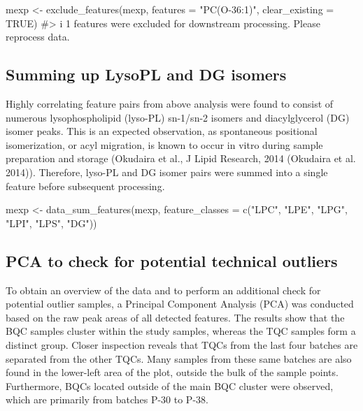 \documentclass[
  letterpaper,
  DIV=11,
  numbers=noendperiod]{scrartcl}
\newenvironment{Shaded}{\begin{snugshade}}{\end{snugshade}}
\newcommand{\AttributeTok}[1]{\textcolor[rgb]{0.40,0.45,0.13}{#1}}
\newcommand{\CommentTok}[1]{\textcolor[rgb]{0.37,0.37,0.37}{#1}}
\newcommand{\ConstantTok}[1]{\textcolor[rgb]{0.56,0.35,0.01}{#1}}
\newcommand{\FunctionTok}[1]{\textcolor[rgb]{0.28,0.35,0.67}{#1}}
\newcommand{\NormalTok}[1]{\textcolor[rgb]{0.00,0.23,0.31}{#1}}
\newcommand{\OtherTok}[1]{\textcolor[rgb]{0.00,0.23,0.31}{#1}}
\newcommand{\StringTok}[1]{\textcolor[rgb]{0.13,0.47,0.30}{#1}}
\begin{document}
\begin{Shaded}
\begin{Highlighting}[]
\NormalTok{mexp }\OtherTok{\textless{}{-}} \FunctionTok{exclude\_features}\NormalTok{(mexp, }\AttributeTok{features =} \StringTok{"PC(O{-}36:1)"}\NormalTok{, }\AttributeTok{clear\_existing =} \ConstantTok{TRUE}\NormalTok{)}
\CommentTok{\#\textgreater{} i 1 features were excluded for downstream processing. Please reprocess data.}
\end{Highlighting}
\end{Shaded}

\subsection{Summing up LysoPL and DG
isomers}\label{summing-up-lysopl-and-dg-isomers}

Highly correlating feature pairs from above analysis were found to
consist of numerous lysophospholipid (lyso-PL) sn-1/sn-2 isomers and
diacylglycerol (DG) isomer peaks. This is an expected observation, as
spontaneous positional isomerization, or acyl migration, is known to
occur in vitro during sample preparation and storage (Okudaira et al., J
Lipid Research, 2014 (Okudaira et al. 2014)). Therefore, lyso-PL and DG
isomer pairs were summed into a single feature before subsequent
processing.

\begin{Shaded}
\begin{Highlighting}[]
\NormalTok{mexp }\OtherTok{\textless{}{-}} \FunctionTok{data\_sum\_features}\NormalTok{(mexp, }\AttributeTok{feature\_classes =} \FunctionTok{c}\NormalTok{(}\StringTok{"LPC"}\NormalTok{, }\StringTok{"LPE"}\NormalTok{, }\StringTok{"LPG"}\NormalTok{, }\StringTok{"LPI"}\NormalTok{, }\StringTok{"LPS"}\NormalTok{, }\StringTok{"DG"}\NormalTok{))}
\end{Highlighting}
\end{Shaded}

\subsection{PCA to check for potential technical
outliers}\label{pca-to-check-for-potential-technical-outliers}

To obtain an overview of the data and to perform an additional check for
potential outlier samples, a Principal Component Analysis (PCA) was
conducted based on the raw peak areas of all detected features. The
results show that the BQC samples cluster within the study samples,
whereas the TQC samples form a distinct group. Closer inspection reveals
that TQCs from the last four batches are separated from the other TQCs.
Many samples from these same batches are also found in the lower-left
area of the plot, outside the bulk of the sample points. Furthermore,
BQCs located outside of the main BQC cluster were observed, which are
primarily from batches P-30 to P-38.
\end{document}
